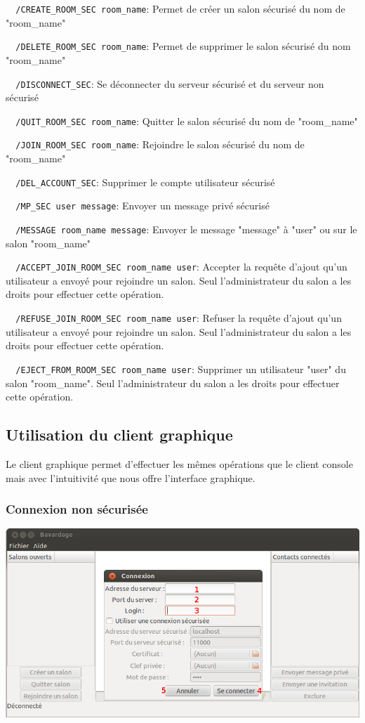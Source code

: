 \documentclass[a4paper,11pt,french]{book}
\begin{document}
\verb+	/CREATE_ROOM_SEC room_name+: Permet de créer un salon sécurisé du nom de "room\_name"

\verb+	/DELETE_ROOM_SEC room_name+: Permet de supprimer le salon sécurisé du nom "room\_name"

\verb+	/DISCONNECT_SEC+: Se déconnecter du serveur sécurisé et du serveur non sécurisé

\verb+	/QUIT_ROOM_SEC room_name+: Quitter le salon sécurisé du nom de "room\_name"

\verb+	/JOIN_ROOM_SEC room_name+: Rejoindre le salon sécurisé du nom de "room\_name"

\verb+	/DEL_ACCOUNT_SEC+: Supprimer le compte utilisateur sécurisé

\verb+	/MP_SEC user message+: Envoyer un message privé sécurisé

\verb+	/MESSAGE room_name message+: Envoyer le message "message" à "user" ou sur le salon "room\_name"

\verb+	/ACCEPT_JOIN_ROOM_SEC room_name user+: Accepter la requête d'ajout qu'un utilisateur a envoyé pour rejoindre un salon. Seul l'administrateur du salon a les droits pour effectuer cette opération.

\verb+	/REFUSE_JOIN_ROOM_SEC room_name user+: Refuser la requête d'ajout qu'un utilisateur a envoyé pour rejoindre un salon. Seul l'administrateur du salon a les droits pour effectuer cette opération.

\verb+	/EJECT_FROM_ROOM_SEC room_name user+: Supprimer un utilisateur "user" du salon "room\_name". Seul l'administrateur du salon a les droits pour effectuer cette opération.


\subsection{Utilisation du client graphique}

Le client graphique permet d'effectuer les mêmes opérations que le client console mais avec l'intuitivité que nous offre l'interface graphique.

\subsubsection{Connexion non sécurisée}
\includegraphics[width=45em]{capture/con_n_sec.png}
\end{document}
